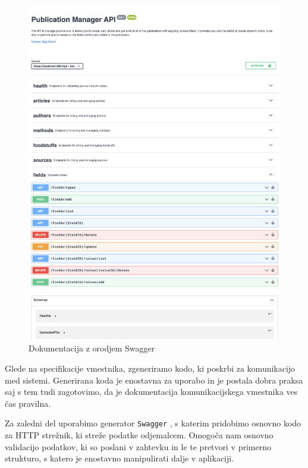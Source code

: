 \documentclass[a4paper, 12pt]{book}
\begin{document}
\begin{figure}[h]
\begin{center}
\includegraphics[width=1\textwidth]{slike/documentation.png}
\end{center}
\caption{ Dokumentacija z orodjem Swagger }
\label{swagger-docs}
\end{figure}

Glede na specifikacije vmestnika, zgeneriramo kodo, ki poskrbi za komunikacijo med sistemi. Generirana koda je enostavna za uporabo in je postala dobra praksa saj s tem tudi zagotovimo, da je dokumentacija komunikacijskega vmestnika ves čas pravilna. 

Za zaledni del uporabimo generator \verb=Swagger= \cite{swagger-codegen}, s katerim pridobimo osnovno kodo za HTTP strežnik, ki streže podatke odjemalcem. Omogoča nam osnovno validacijo podatkov, ki so poslani v zahtevku in le te pretvori v primerno strukturo, s katero je enostavno manipulirati dalje v aplikaciji. 
\end{document}
